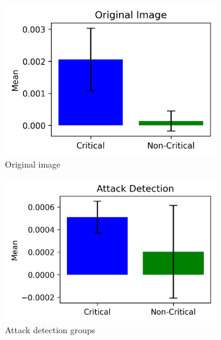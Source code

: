 \documentclass[10pt, conference, a4paper, final]{IEEEtran}
\begin{document}
    \begin{figure}[ht!]
        \centering
        \begin{subfigure}{.30\textwidth}
            \centering
            \includegraphics[width=\linewidth]{paper_images/Originalbar_chart.png}
            \caption{Original image}
        \end{subfigure}
        \begin{subfigure}{.32\textwidth}
            \centering
            \includegraphics[width=\linewidth]{paper_images/Detectionbar_chart.png}
            \caption{Attack detection groups}
        \end{subfigure}
        \begin{subfigure}{.31\textwidth}
            \centering

\end{subfigure}
\end{figure}
\end{document}
